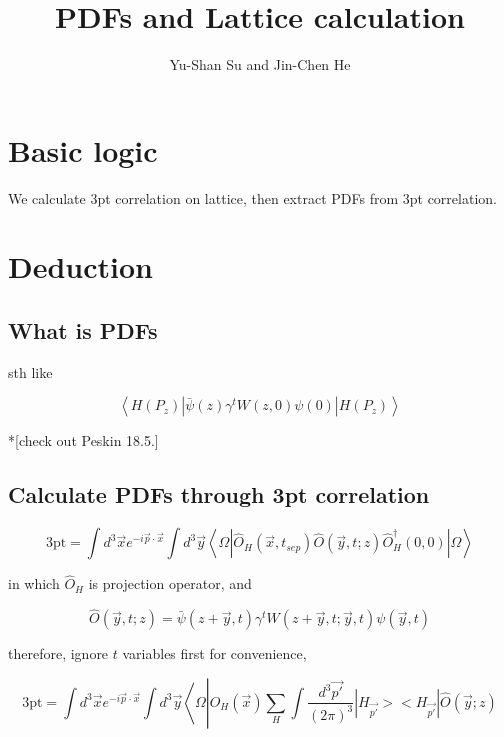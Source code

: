 \documentclass[prd,aps,nofootinbib,floatfix,10pt]{revtex4}
\begin{document}
\title{PDFs and Lattice calculation}
\author{Yu-Shan Su and Jin-Chen He}
\maketitle

\section{Basic logic}

\noindent 

We calculate 3pt correlation on lattice, then extract PDFs from 3pt correlation.


\section{Deduction}

\subsection{What is PDFs}

\noindent

sth like 

\[ \left\langle H\left(P_{z}\right)\left|\bar{\psi}(z) \gamma^{t} W(z, 0) \psi(0)\right| H\left(P_{z}\right)\right\rangle \]

*[check out Peskin 18.5.]

\subsection{Calculate PDFs through 3pt correlation}

\noindent

\[ \text{3pt} = \int d^{3} \vec{x} e^{-i \vec{p} \cdot \vec{x}} \int d^3 \vec{y}\left\langle\Omega\left|\hat{O}_{H}\left(\vec{x}, t_{s e p}\right) \hat{O}(\vec{y}, t ; z) \hat{O}_{H}^{\dagger}(0,0)\right| \Omega\right\rangle \]

in which $\hat{O}_{H}$ is projection operator, and 

\[ \hat{O}(\vec{y}, t ; z)=\bar{\psi}(z+\vec{y}, t) \gamma^{t} W(z+\vec{y}, t ; \vec{y}, t) \psi(\vec{y}, t) \]

therefore, {\color{red}ignore $t$ variables first for convenience,}

\[ \text{3pt} = \int d^{3} \vec{x} e^{-i \vec{p} \cdot \vec{x}} \int d^3 \vec{y}\left\langle\Omega\left|\hat{O}_{H}\left(\vec{x}\right) \sum_{H} \int \frac{d^3 \vec{p'}}{(2\pi)^3}  |H_{\vec{p'}}><H_{\vec{p'}}| \hat{O}(\vec{y}; z) \right. \right. \]
    
\end{document}
